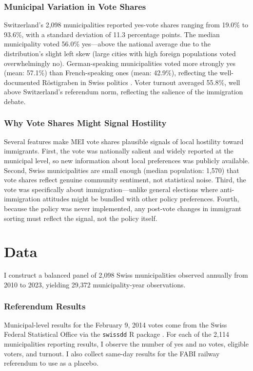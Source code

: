 \documentclass[12pt]{article}
\begin{document}
\subsubsection*{Municipal Variation in Vote Shares} Switzerland's 2,098 municipalities reported yes-vote shares ranging from 19.0\% to 93.6\%, with a standard deviation of 11.3 percentage points. The median municipality voted 56.0\% yes---above the national average due to the distribution's slight left skew (large cities with high foreign populations voted overwhelmingly no). German-speaking municipalities voted more strongly yes (mean: 57.1\%) than French-speaking ones (mean: 42.9\%), reflecting the well-documented Röstigraben in Swiss politics \citep{linder2010}. Voter turnout averaged 55.8\%, well above Switzerland's referendum norm, reflecting the salience of the immigration debate.

\subsubsection*{Why Vote Shares Might Signal Hostility} Several features make MEI vote shares plausible signals of local hostility toward immigrants. First, the vote was nationally salient and widely reported at the municipal level, so new information about local preferences was publicly available. Second, Swiss municipalities are small enough (median population: 1,570) that vote shares reflect genuine community sentiment, not statistical noise. Third, the vote was specifically about immigration---unlike general elections where anti-immigration attitudes might be bundled with other policy preferences. Fourth, because the policy was never implemented, any post-vote changes in immigrant sorting must reflect the signal, not the policy itself.

\section{Data}

I construct a balanced panel of 2,098 Swiss municipalities observed annually from 2010 to 2023, yielding 29,372 municipality-year observations.

\subsubsection*{Referendum Results} Municipal-level results for the February 9, 2014 votes come from the Swiss Federal Statistical Office via the \texttt{swissdd} R package \citep{swissdd}. For each of the 2,114 municipalities reporting results, I observe the number of yes and no votes, eligible voters, and turnout. I also collect same-day results for the FABI railway referendum to use as a placebo.
\end{document}
